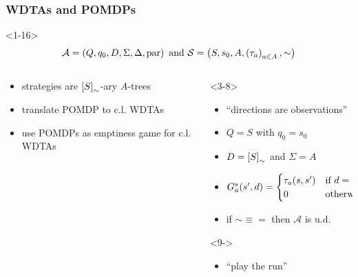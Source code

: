 \documentclass{beamer}
\begin{document}
  \begin{frame}
    \frametitle{\acp{WDTA} and \acp{POMDP}}
    \begin{onlyenv}<1-16>
      \begin{equation*}
        \mathcal{A} = \left(Q, q_{0}, D, \Sigma, \Delta, \operatorname{par}\right)
        \text{ and }
        \mathcal{S} = \left(S, s_{0}, A, \left(\tau_{a}\right)_{a\in A}, \sim\right)
      \end{equation*}
      \begin{overlayarea}{\textwidth}{0.8\textheight}
        \begin{columns}
          \begin{column}{0.35\textwidth}
            \begin{itemize}
              \item<2-> strategies are
                $\left[S\right]_{\sim}$-ary $A$-trees
              \item<3-> translate \acs{POMDP} to c.l. \acp{WDTA}
              \item<9-> use \acp{POMDP} as emptiness game for c.l. \acp{WDTA}
            \end{itemize}
          \end{column}
          \begin{column}{0.65\textwidth}
            \begin{onlyenv}<3-8>
              \begin{itemize}
                \item<4-> \enquote{directions are observations}
                \item<5-> $Q = S$ with $q_{0} = s_{0}$
                \item<6-> $D = \left[S\right]_{\sim}$ and $\Sigma = A$
                \item<7-> $G_{a}^{s}(s', d) = \begin{cases}
                    \tau_{a}(s, s')&\text{if }d = \left[s'\right]_{\sim},\\
                    0&\text{otherwise}.
                \end{cases}$
              \item<8-> if $\sim\equiv =$ then $\mathcal{A}$ is u.d.
              \end{itemize}
            \end{onlyenv}
            \begin{onlyenv}<9->
              \begin{itemize}
                \item<10-> \enquote{play the run}

\end{itemize}
\end{onlyenv}
\end{column}
\end{columns}
\end{overlayarea}
\end{onlyenv}
\end{frame}
\end{document}
